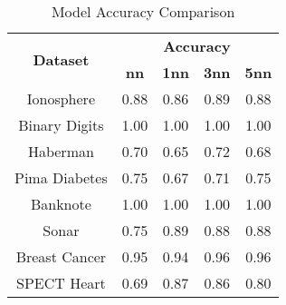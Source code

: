\begin{table}[htbp]
\caption{Model Accuracy Comparison}
\begin{center}
\begin{tabular}{|c|c|c|c|c|}
\hline
\multirow{2}{*}{\textbf{Dataset}} & \multicolumn{4}{c|}{\textbf{Accuracy}} \\ \cline{2-5}
 & \textbf{nn} & \textbf{1nn} & \textbf{3nn} & \textbf{5nn} \\ \hline
Ionosphere & 0.88 & 0.86 & 0.89 & 0.88 \\ \hline
Binary Digits & 1.00 & 1.00 & 1.00 & 1.00 \\ \hline
Haberman & 0.70 & 0.65 & 0.72 & 0.68 \\ \hline
Pima Diabetes & 0.75 & 0.67 & 0.71 & 0.75 \\ \hline
Banknote & 1.00 & 1.00 & 1.00 & 1.00 \\ \hline
Sonar & 0.75 & 0.89 & 0.88 & 0.88 \\ \hline
Breast Cancer & 0.95 & 0.94 & 0.96 & 0.96 \\ \hline
SPECT Heart & 0.69 & 0.87 & 0.86 & 0.80 \\ \hline
\end{tabular}
\label{tab:accuracy}
\end{center}
\end{table}